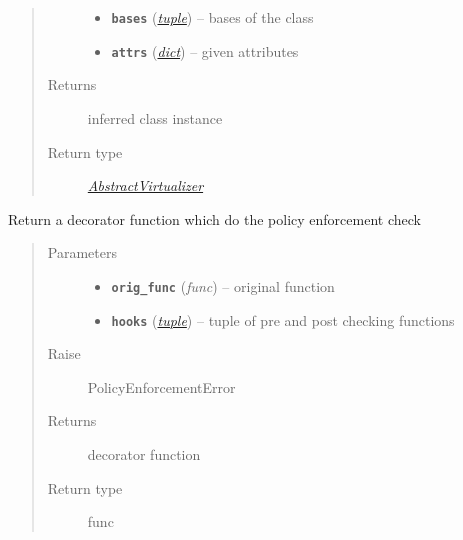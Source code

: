 \documentclass[letterpaper,10pt,english]{sphinxmanual}
\begin{document}
\begin{fulllineitems}
\begin{fulllineitems}
\begin{quote}
\begin{description}
\begin{itemize}
\item {} 
\textbf{\texttt{bases}} (\href{https://docs.python.org/2.7/library/functions.html\#tuple}{\emph{tuple}}) -- bases of the class

\item {} 
\textbf{\texttt{attrs}} (\href{https://docs.python.org/2.7/library/stdtypes.html\#dict}{\emph{dict}}) -- given attributes

\end{itemize}

\item[{Returns}] \leavevmode
inferred class instance

\item[{Return type}] \leavevmode
{\hyperref[orchest/virtualization_mgmt:escape.orchest.virtualization_mgmt.AbstractVirtualizer]{\emph{AbstractVirtualizer}}}

\end{description}\end{quote}

\end{fulllineitems}


\begin{fulllineitems}
\label{orchest/policy_enforcement:escape.orchest.policy_enforcement.PolicyEnforcementMetaClass.get_wrapper}
Return a decorator function which do the policy enforcement check
\begin{quote}\begin{description}
\item[{Parameters}] \leavevmode\begin{itemize}
\item {} 
\textbf{\texttt{orig\_func}} (\emph{func}) -- original function

\item {} 
\textbf{\texttt{hooks}} (\href{https://docs.python.org/2.7/library/functions.html\#tuple}{\emph{tuple}}) -- tuple of pre and post checking functions

\end{itemize}

\item[{Raise}] \leavevmode
PolicyEnforcementError

\item[{Returns}] \leavevmode
decorator function

\item[{Return type}] \leavevmode
func

\end{description}\end{quote}

\end{fulllineitems}


\end{fulllineitems}
\end{document}
